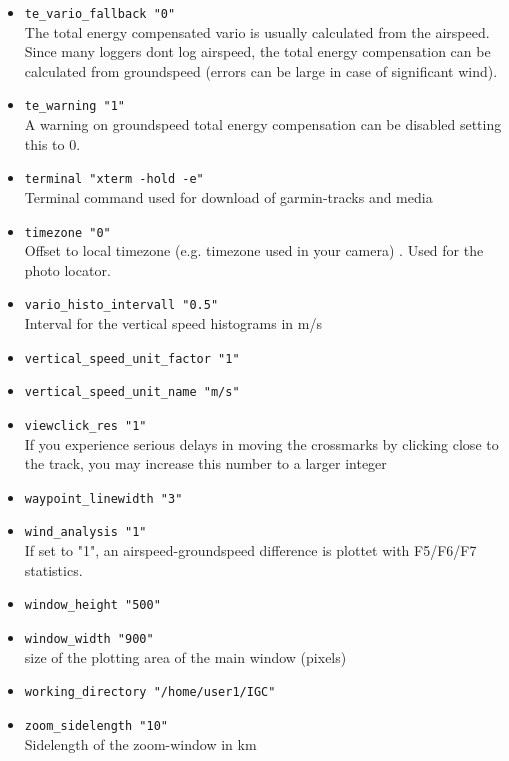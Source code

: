 \begin{itemize}
\item \texttt{te\_vario\_fallback "0"}\\
The total energy compensated vario is usually calculated from the airspeed. Since many loggers dont log airspeed,
the total energy compensation can be calculated from groundspeed (errors can be large in case of significant wind).

\item \texttt{te\_warning    "1"}\\
A warning on groundspeed total energy compensation can be disabled setting this to 0.

\item \texttt{terminal	"xterm -hold -e"}\\
Terminal command used for download of garmin-tracks and media

\item \texttt{timezone    "0"}\\
Offset to local timezone (e.g. timezone used in your camera) . Used for the photo locator.

\item \texttt{vario\_histo\_intervall    "0.5"}\\
    Interval for the vertical speed histograms in m/s
\item \texttt{vertical\_speed\_unit\_factor    "1"}
\item \texttt{vertical\_speed\_unit\_name    "m/s"}

\item \texttt{viewclick\_res "1"}\\
	If you experience serious delays in moving the crossmarks by clicking close to the track, you may increase this number to a larger integer

\item \texttt{waypoint\_linewidth    "3"}
\item \texttt{wind\_analysis "1"} \\
If set to "1", an airspeed-groundspeed difference is plottet with F5/F6/F7 statistics.

\item \texttt{window\_height "500"} \\
\item \texttt{window\_width "900"} \\
size of the plotting area of the main window (pixels)


\item \texttt{working\_directory    "/home/user1/IGC"}
\item \texttt{zoom\_sidelength    "10"}\\
    Sidelength of the zoom-window in km


\end{itemize}
